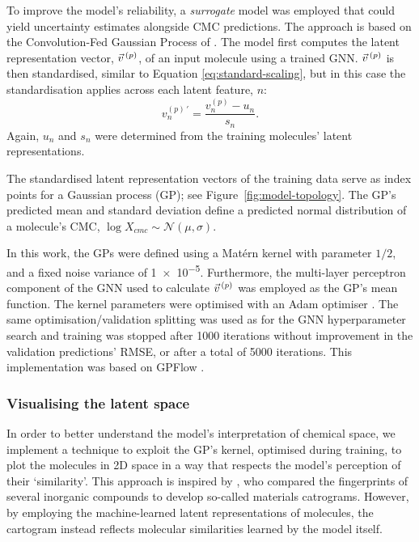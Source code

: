 To improve the model's reliability, a \emph{surrogate} model was employed that could yield uncertainty estimates alongside CMC predictions. The approach is based on the Convolution-Fed Gaussian Process of \citet{tranMethodsComparingUncertainty2020}. The model first computes the latent representation vector, $\vec{v}^{\,(p)}{}$, of an input molecule using a trained GNN. $\vec{v}^{\,(p)}{}$ is then standardised, similar to Equation \ref{eq:standard-scaling},
but in this case the standardisation applies across each latent feature, $n$:
\begin{equation}
    v^{(p)\,\prime}_n = \frac{v^{(p)}_n - u_n}{s_n}.
\end{equation}
Again, $u_n$ and $s_n$ were determined from the training molecules' latent representations.

The standardised latent representation vectors of the training data serve as index points for a Gaussian process (GP); see Figure~\ref{fig:model-topology}.
The GP's predicted mean and standard deviation define a predicted normal distribution of a molecule's CMC, $\log X_{cmc} \sim \mathcal{N}(\mu, \sigma)$.

In this work, the GPs  were defined using a Mat\'ern kernel with parameter $1/2$, and a fixed noise variance of \num{1e-5}. Furthermore, the multi-layer perceptron component of the GNN used to calculate $\vec{v}^{\,(p)}{}$ was employed as the GP's mean function.
The kernel parameters were optimised with an Adam optimiser \cite{kingmaAdamMethodStochastic2017}.
The same optimisation/validation splitting was used as for the GNN hyperparameter search and training was stopped after \num{1000} iterations without improvement in the validation predictions' RMSE, or after a total of \num{5000} iterations. This implementation was based on GPFlow \cite{matthewsGPflowGaussianProcess2017}.

\subsubsection{Visualising the latent space}

In order to better understand the model's interpretation of chemical space, we
implement a technique to exploit the GP's kernel, optimised during training, to
plot the molecules in 2D space in a way that respects the model's perception of
their `similarity'. This approach is inspired by
\citet{isayevMaterialsCartographyRepresenting2015}, who compared the
fingerprints of several inorganic compounds to develop so-called materials
catrograms. However, by employing the machine-learned latent representations of
molecules, the cartogram instead reflects molecular similarities learned by the
model itself.

